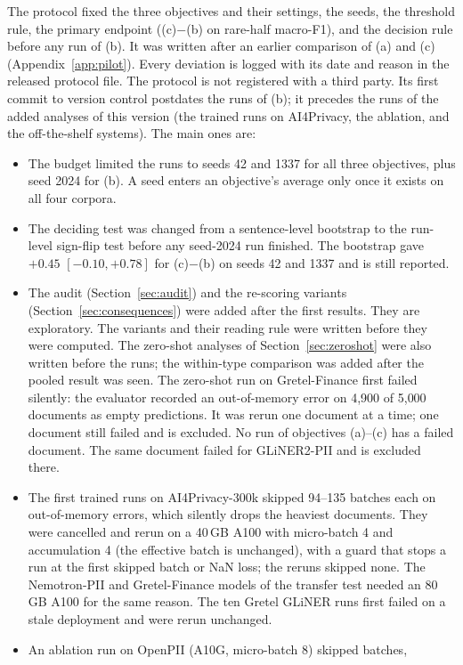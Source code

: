 \documentclass[11pt]{article}
\begin{document}
The protocol fixed the three objectives and their settings, the seeds,
the threshold rule, the primary endpoint ((c)$-$(b) on rare-half
macro-F1), and the decision rule before any run of (b). It was written
after an earlier comparison of (a) and (c) (Appendix~\ref{app:pilot}).
Every deviation is logged with its date and reason in the released
protocol file. The protocol is not registered with a third party. Its
first commit to version control postdates the runs of (b); it precedes
the runs of the added analyses of this version (the trained runs on
AI4Privacy, the ablation, and the off-the-shelf systems). The main ones are:
\begin{itemize}
\item The budget limited the runs to seeds 42 and 1337 for all three
objectives, plus seed 2024 for (b). A seed enters an objective's average
only once it exists on all four corpora.
\item The deciding test was changed from a sentence-level bootstrap to
the run-level sign-flip test before any seed-2024 run finished. The
bootstrap gave $+0.45$ $[-0.10,+0.78]$ for (c)$-$(b) on seeds 42 and
1337 and is still reported.
\item The audit (Section~\ref{sec:audit}) and the re-scoring variants
(Section~\ref{sec:consequences}) were added after the first results.
They are exploratory. The variants and their reading rule were written
before they were computed. The zero-shot analyses of
Section~\ref{sec:zeroshot} were also written before the runs; the
within-type comparison was added after the pooled result was seen.
The zero-shot run on Gretel-Finance first failed silently: the evaluator
recorded an out-of-memory error on 4{,}900 of 5{,}000 documents as empty
predictions. It was rerun one document at a time; one document still
failed and is excluded. No run of objectives (a)--(c) has a failed
document. The same document failed for GLiNER2-PII and is excluded there.
\item The first trained runs on AI4Privacy-300k skipped 94--135
batches each on out-of-memory errors, which silently drops the heaviest
documents. They were cancelled and rerun on a 40\,GB A100 with micro-batch
4 and accumulation 4 (the effective batch is unchanged), with a guard
that stops a run at the first skipped batch or NaN loss; the reruns
skipped none. The Nemotron-PII and Gretel-Finance models of the transfer
test needed an 80\,GB A100 for the same reason. The ten Gretel GLiNER
runs first failed on a stale deployment and were rerun unchanged.
\item An ablation run on OpenPII (A10G, micro-batch 8) skipped batches,

\end{itemize}
\end{document}
